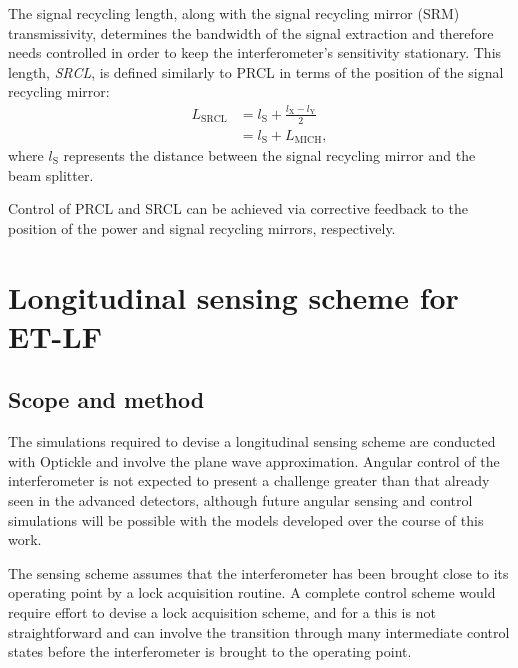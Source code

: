 The signal recycling length, along with the signal recycling mirror (\gls{SRM}) transmissivity, determines the bandwidth of the signal extraction and therefore needs controlled in order to keep the interferometer's sensitivity stationary. This length, \emph{\gls{SRCL}}, is defined similarly to \gls{PRCL} in terms of the position of the signal recycling mirror:
\begin{equation}
  \label{eq:srcl-length}
  \begin{split}
    L_{\text{SRCL}} &= l_{\text{S}} + \frac{l_{\text{X}} - l_{\text{Y}}}{2} \\
		    &= l_{\text{S}} + L_{\text{MICH}},
  \end{split}
\end{equation}
where $l_{\text{S}}$ represents the distance between the signal recycling mirror and the beam splitter.

Control of \gls{PRCL} and \gls{SRCL} can be achieved via corrective feedback to the position of the power and signal recycling mirrors, respectively.

\section{Longitudinal sensing scheme for ET-LF}

\subsection{Scope and method}
The simulations required to devise a longitudinal sensing scheme are conducted with Optickle and involve the plane wave approximation. Angular control of the interferometer is not expected to present a challenge greater than that already seen in the advanced detectors, although future angular sensing and control simulations will be possible with the models developed over the course of this work.

The sensing scheme assumes that the interferometer has been brought close to its operating point by a lock acquisition routine. A complete control scheme would require effort to devise a lock acquisition scheme, and for a \DRFPMI{} this is not straightforward and can involve the transition through many intermediate control states before the interferometer is brought to the operating point.

